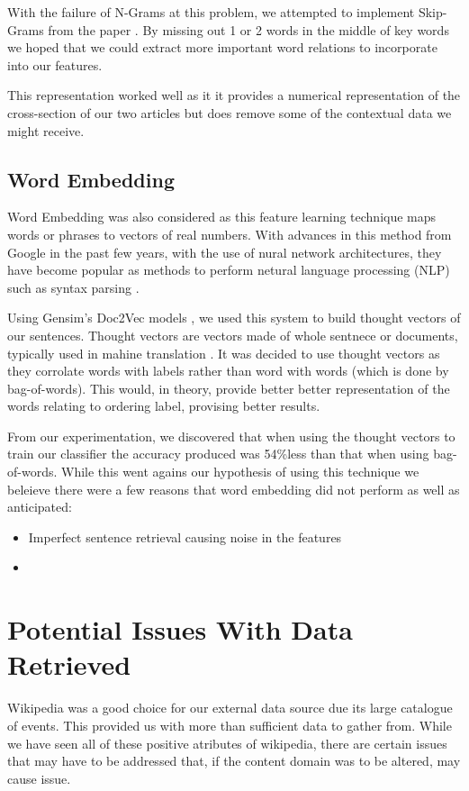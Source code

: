 \documentclass[bsc,frontabs,twoside,singlespacing,parskip,deptreport]{infthesis}     %
\begin{document}
With the failure of N-Grams at this problem, we attempted to implement Skip-Grams from the paper \cite{guthrie2006closer}.
By missing out 1 or 2 words in the middle of key words we hoped that we could extract more important word relations to
incorporate into our features.

This representation worked well as it it provides a numerical representation of the cross-section of our two articles
but does remove some of the contextual data we might receive.

\subsection{Word Embedding} \label{sec:word-embedding}
Word Embedding was also considered as this feature learning technique maps words or phrases to vectors of real numbers.
With advances in this method from Google in the past few years, with the use of nural network architectures, they have become
popular as methods to perform netural language processing (NLP) such as syntax parsing \cite{socher2013parsing}.

Using Gensim's Doc2Vec models \cite{}, we used this system to build thought vectors of our sentences. Thought vectors are vectors
made of whole sentnece or documents, typically used in mahine translation \cite{deeplearning4j}.
It was decided to use thought vectors as they corrolate words with labels rather than word with words (which is done by bag-of-words).
This would, in theory, provide better better representation of the words relating to ordering label, provising better results.



From our experimentation, we discovered that when using the thought vectors to train our classifier the accuracy produced was 54\%less than that when
using bag-of-words. While this went agains our hypothesis of using this technique we beleieve there were a few reasons that word embedding did
not perform as well as anticipated:
\begin{itemize}
  \item Imperfect sentence retrieval causing noise in the features
  \item 
\end{itemize}



\section{Potential Issues With Data Retrieved}\label{sec:dataIssues}
Wikipedia was a good choice for our external data source due its large catalogue of events.
This provided us with more than sufficient data to gather from.
While we have seen all of these positive atributes of wikipedia, there are certain issues that may have to be addressed
that, if the content domain was to be altered, may cause issue.
\end{document}
